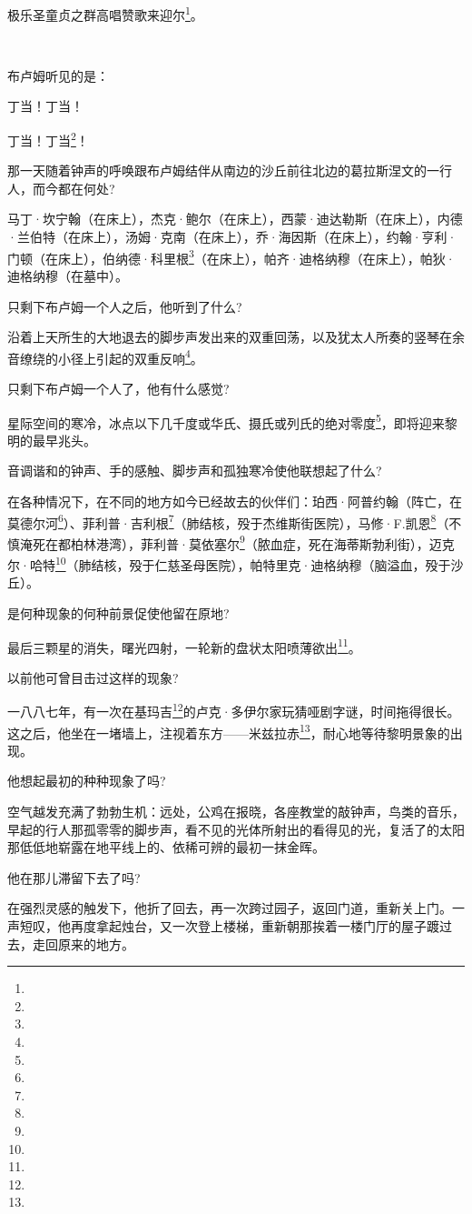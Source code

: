 \par 极乐圣童贞之群高唱赞歌来迎尔\footnote{}。
\par  
\par 布卢姆听见的是：
\par 丁当！丁当！
\par 丁当！丁当\footnote{}！
\par 那一天随着钟声的呼唤跟布卢姆结伴从南边的沙丘前往北边的葛拉斯涅文的一行人，而今都在何处?
\par 马丁·坎宁翰（在床上），杰克·鲍尔（在床上），西蒙·迪达勒斯（在床上），内德·兰伯特（在床上），汤姆·克南（在床上），乔·海因斯（在床上），约翰·亨利·门顿（在床上），伯纳德·科里根\footnote{}（在床上），帕齐·迪格纳穆（在床上），帕狄·迪格纳穆（在墓中）。
\par 只剩下布卢姆一个人之后，他听到了什么?
\par 沿着上天所生的大地退去的脚步声发出来的双重回荡，以及犹太人所奏的竖琴在余音缭绕的小径上引起的双重反响\footnote{}。
\par 只剩下布卢姆一个人了，他有什么感觉?
\par 星际空间的寒冷，冰点以下几千度或华氏、摄氏或列氏的绝对零度\footnote{}，即将迎来黎明的最早兆头。
\par 音调谐和的钟声、手的感触、脚步声和孤独寒冷使他联想起了什么?
\par 在各种情况下，在不同的地方如今已经故去的伙伴们：珀西·阿普约翰（阵亡，在莫德尔河\footnote{}）、菲利普·吉利根\footnote{}（肺结核，殁于杰维斯街医院），马修·F.凯恩\footnote{}（不慎淹死在都柏林港湾），菲利普·莫依塞尔\footnote{}（脓血症，死在海蒂斯勃利街），迈克尔·哈特\footnote{}（肺结核，殁于仁慈圣母医院），帕特里克·迪格纳穆（脑溢血，殁于沙丘）。
\par 是何种现象的何种前景促使他留在原地?
\par 最后三颗星的消失，曙光四射，一轮新的盘状太阳喷薄欲出\footnote{}。
\par 以前他可曾目击过这样的现象?
\par 一八八七年，有一次在基玛吉\footnote{}的卢克·多伊尔家玩猜哑剧字谜，时间拖得很长。这之后，他坐在一堵墙上，注视着东方——米兹拉赤\footnote{}，耐心地等待黎明景象的出现。
\par 他想起最初的种种现象了吗?
\par 空气越发充满了勃勃生机：远处，公鸡在报晓，各座教堂的敲钟声，鸟类的音乐，早起的行人那孤零零的脚步声，看不见的光体所射出的看得见的光，复活了的太阳那低低地崭露在地平线上的、依稀可辨的最初一抹金晖。
\par 他在那儿滞留下去了吗?
\par 在强烈灵感的触发下，他折了回去，再一次跨过园子，返回门道，重新关上门。一声短叹，他再度拿起烛台，又一次登上楼梯，重新朝那挨着一楼门厅的屋子踱过去，走回原来的地方。
